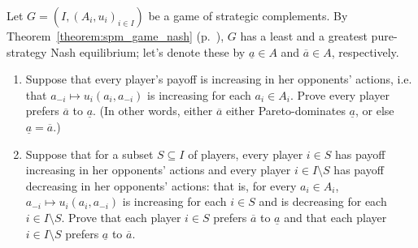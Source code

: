 \begin{exercise}
	\label{exercise:spm_welfare}
	Let $G = (I,(A_i,u_i)_{i \in I})$ be a game of strategic complements. By Theorem~\ref*{theorem:spm_game_nash} (p.~\pageref*{theorem:spm_game_nash}), $G$ has a least and a greatest pure-strategy Nash equilibrium; let's denote these by $\underline{a} \in A$ and $\overline{a} \in A$, respectively.

	\begin{enumerate}[label=(\alph*)]

		\item \label{spm_welfare_special} Suppose that every player's payoff is increasing in her opponents' actions, i.e. that $a_{-i} \mapsto u_i(a_i,a_{-i})$ is increasing for each $a_i \in A_i$. Prove every player prefers $\overline{a}$ to $\underline{a}$. (In other words, either $\overline{a}$ either Pareto-dominates $\underline{a}$, or else $\underline{a}=\overline{a}$.)

		\item \label{spm_welfare} Suppose that for a subset $S \subseteq I$ of players, every player $i \in S$ has payoff increasing in her opponents' actions and every player $i \in I \setminus S$ has payoff decreasing in her opponents' actions: that is, for every $a_i \in A_i$, $a_{-i} \mapsto u_i(a_i,a_{-i})$ is increasing for each $i \in S$ and is decreasing for each $i \in I \setminus S$. Prove that each player $i \in S$ prefers $\overline{a}$ to $\underline{a}$ and that each player $i \in I \setminus S$ prefers $\underline{a}$ to $\overline{a}$.

	\end{enumerate}
\end{exercise}
